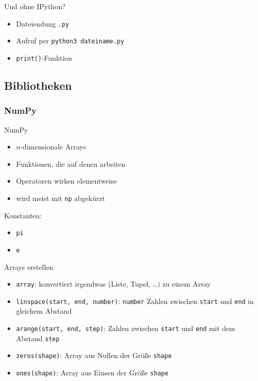 \begin{frame}[fragile]{Und ohne IPython?}
  \begin{itemize}
    \item Dateiendung \texttt{.py}
    \item Aufruf per \texttt{python3 dateiname.py}
    \item \texttt{print()}-Funktion 
  \end{itemize}
\end{frame}

\subsection{Bibliotheken}
\subsubsection{NumPy}
\begin{frame}{NumPy}
  \begin{itemize}
    \item $n$-dimensionale Arrays
    \item Funktionen, die auf denen arbeiten
    \item Operatoren wirken elementweise
    \item wird meist mit \texttt{np} abgekürzt
  \end{itemize}

  Konstanten:
  \begin{itemize}
    \item \texttt{pi}
    \item \texttt{e}
  \end{itemize}
\end{frame}

\begin{frame}{Arrays erstellen}
  \begin{itemize}
    \item \texttt{array}: konvertiert irgendwas (Liste, Tupel, …) zu einem Array
    \item \texttt{linspace(start, end, number)}: \texttt{number} Zahlen zwischen \texttt{start} und \texttt{end} in gleichem Abstand
    \item \texttt{arange(start, end, step)}: Zahlen zwischen \texttt{start} und \texttt{end} mit dem Abstand \texttt{step}
    \item \texttt{zeros(shape)}: Array aus Nullen der Größe \texttt{shape}
    \item \texttt{ones(shape)}: Array aus Einsen der Größe \texttt{shape}
  \end{itemize}
\end{frame}

